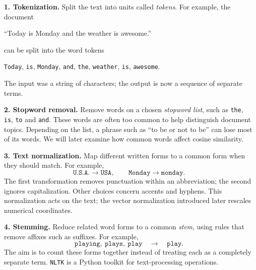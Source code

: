 \documentclass[a4paper,12pt,oneside]{report}
\begin{document}
\begin{center}
\end{center}

\textbf{1. Tokenization.}
Split the text into units called \emph{tokens}. For example, the
document
\begin{center}
  ``Today is Monday and the weather is awesome.''
\end{center}
can be split into the word tokens
\begin{center}
  \texttt{Today}, \texttt{is}, \texttt{Monday}, \texttt{and},
  \texttt{the}, \texttt{weather}, \texttt{is}, \texttt{awesome}.
\end{center}
The input was a string of characters; the output is now a sequence
of separate terms.

\textbf{2. Stopword removal.}
Remove words on a chosen \emph{stopword list}, such as
\texttt{the}, \texttt{is}, \texttt{to} and \texttt{and}. These words
are often too common to help distinguish document topics. Depending
on the list, a phrase such as ``to be or not to be'' can lose most
of its words. We will later examine how common words affect cosine
similarity.

\textbf{3. Text normalization.}
Map different written forms to a common form when they should match.
For example,
\[
  \texttt{U.S.A.}\longrightarrow\texttt{USA},\qquad
  \texttt{Monday}\longrightarrow\texttt{monday}.
\]
The first transformation removes punctuation within an abbreviation;
the second ignores capitalization. Other choices concern accents
and hyphens. This normalization acts on the text; the vector
normalization introduced later rescales numerical coordinates.

\textbf{4. Stemming.}
Reduce related word forms to a common \emph{stem}, using rules that
remove affixes such as suffixes. For example,
\[
  \texttt{playing},\ \texttt{plays},\ \texttt{play}
  \quad\longrightarrow\quad\texttt{play}.
\]
The aim is to count these forms together instead of treating each
as a completely separate term. \texttt{NLTK} is a Python toolkit
for text-processing operations.
\end{document}
